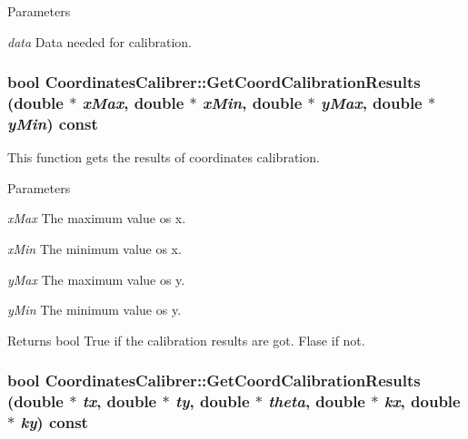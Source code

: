 \begin{DoxyParams}{Parameters}
\item[{\em data}]Data needed for calibration. \end{DoxyParams}
\hypertarget{classCoordinatesCalibrer_a1a3ae703556c2f4c4455792a43fed987}{
\subsubsection[{GetCoordCalibrationResults}]{\setlength{\rightskip}{0pt plus 5cm}bool CoordinatesCalibrer::GetCoordCalibrationResults (double $\ast$ {\em xMax}, \/  double $\ast$ {\em xMin}, \/  double $\ast$ {\em yMax}, \/  double $\ast$ {\em yMin}) const}}
\label{classCoordinatesCalibrer_a1a3ae703556c2f4c4455792a43fed987}


This function gets the results of coordinates calibration. 


\begin{DoxyParams}{Parameters}
\item[{\em xMax}]The maximum value os x. \item[{\em xMin}]The minimum value os x. \item[{\em yMax}]The maximum value os y. \item[{\em yMin}]The minimum value os y. \end{DoxyParams}
\begin{DoxyReturn}{Returns}
bool True if the calibration results are got. Flase if not. 
\end{DoxyReturn}
\hypertarget{classCoordinatesCalibrer_a92672252bda26bddd9b8c73bc6395ea3}{
\subsubsection[{GetCoordCalibrationResults}]{\setlength{\rightskip}{0pt plus 5cm}bool CoordinatesCalibrer::GetCoordCalibrationResults (double $\ast$ {\em tx}, \/  double $\ast$ {\em ty}, \/  double $\ast$ {\em theta}, \/  double $\ast$ {\em kx}, \/  double $\ast$ {\em ky}) const}}
\label{classCoordinatesCalibrer_a92672252bda26bddd9b8c73bc6395ea3}



